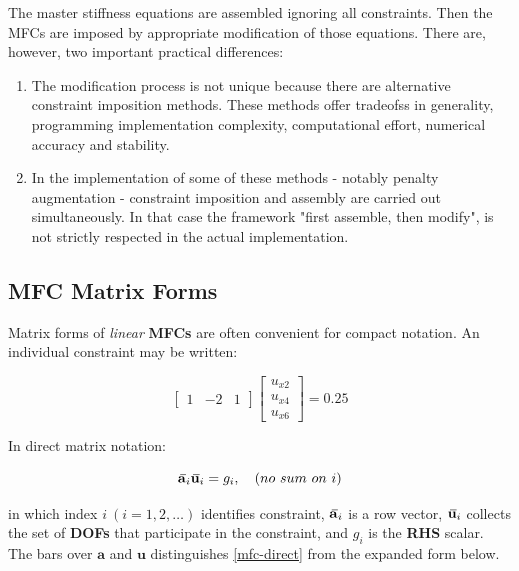 \documentclass[10pt,b5paper,titlepage]{book}
\newcommand{\closure}[2][3]{%
{}\mkern#1mu\overline{\mkern-#1mu#2}}
\begin{document}
The master stiffness equations are assembled ignoring all constraints. Then the MFCs
are imposed by appropriate modification of those equations. There are, however,
two important practical differences:

\begin{enumerate}
    \item The modification process is not unique because there are alternative
        constraint imposition methods. These methods offer tradeofss in generality,
        programming implementation complexity, computational effort, numerical
        accuracy and stability.

    \item In the implementation of some of these methods - notably penalty augmentation
        - constraint imposition and assembly are carried out simultaneously. In that
        case the framework "first assemble, then modify", is not strictly respected
        in the actual implementation.
\end{enumerate}


\subsection{MFC Matrix Forms}

Matrix forms of \textit{linear} \textbf{MFCs} are often convenient for compact
notation. An individual constraint may be written:

\begin{equation}\label{mfc-matrix}
    \begin{bmatrix}
        1 & -2 & 1
    \end{bmatrix}
    \begin{bmatrix}
        u_{x2} \\
        u_{x4} \\
        u_{x6}
    \end{bmatrix}
    = 0.25
\end{equation}

In direct matrix notation:

\begin{equation}\label{mfc-direct}
    \closure{\mathbf{a}}_i \closure{\mathbf{u}}_i = g_i, \quad (no\ sum\ on\ i)
\end{equation}

in which index $ i\ (i = 1, 2,\dots) $ identifies constraint, $ \closure{\mathbf{a}}_i $
is a row vector, $ \closure{\mathbf{u}}_i $ collects the set of \textbf{DOFs}
that participate in the constraint, and $ g_i $ is the \textbf{RHS} scalar.
The bars over $ \mathbf{a} $ and $ \mathbf{u} $ distinguishes
\eqref{mfc-direct} from the expanded form below.
\end{document}
